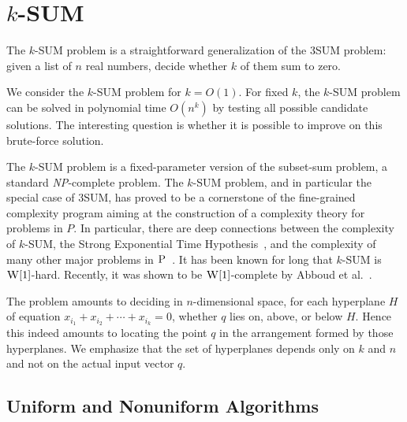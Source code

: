 \section{\(k\)-SUM}\label{sec:problem:ksum}


The \(k\)-SUM problem is a straightforward generalization of the 3SUM problem:
given a list of \(n\) real numbers, decide whether \(k\) of them sum to zero.



We consider the \(k\)-SUM problem for \(k=O(1)\).
For fixed \(k\), the \(k\)-SUM problem can be solved in polynomial time
\(O(n^k)\) by testing all possible candidate solutions.
The interesting question is whether it is possible to improve on
this brute-force solution.

The \(k\)-SUM problem is a fixed-parameter version of the subset-sum problem, a
standard \textit{NP}-complete problem. The \(k\)-SUM problem, and in particular
the special case of 3SUM, has proved to be a cornerstone of the fine-grained
complexity program aiming at the construction of a complexity theory for
problems in $P$. In particular, there are deep connections between the
complexity of \(k\)-SUM, the Strong Exponential Time
Hypothesis~\cite{PW10,CGIMPS15}, and the complexity of many other major
problems in
\(\textsc{P}\)~\cite{GO95,BH99,MO01,P10,ACLL14,AVW14,GP18,KPP14,ALW14,AWY15,CL15}.
It has been known for long that \(k\)-SUM is $\textsc{W}[1]$-hard. Recently, it was shown
to be $\textsc{W}[1]$-complete by Abboud et al.~\cite{ALW14}.

The problem amounts to deciding in $n$-dimensional space, for each hyperplane
\(H\) of equation \(x_{i_1} + x_{i_2} + \cdots +x_{i_k} = 0\), whether \(q\)
lies on, above, or below \(H\). Hence this indeed amounts to locating the point
$q$ in the arrangement formed by those hyperplanes. We emphasize that the set
of hyperplanes depends only on $k$ and $n$ and not on the actual input vector
$q$.

\subsection{Uniform and Nonuniform Algorithms}

